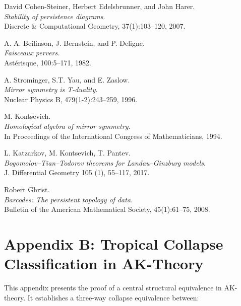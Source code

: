 \documentclass[11pt]{article}
\begin{document}
\begin{thebibliography}{9}

David Cohen-Steiner, Herbert Edelsbrunner, and John Harer.\\
\textit{Stability of persistence diagrams}.\\
Discrete \& Computational Geometry, 37(1):103--120, 2007.

A. A. Beilinson, J. Bernstein, and P. Deligne.\\
\textit{Faisceaux pervers}.\\
Ast\'erisque, 100:5–171, 1982.

A. Strominger, S.T. Yau, and E. Zaslow.\\
\textit{Mirror symmetry is T-duality}.\\
Nuclear Physics B, 479(1-2):243–259, 1996.

M. Kontsevich.\\
\textit{Homological algebra of mirror symmetry}.\\
In Proceedings of the International Congress of Mathematicians, 1994.

L. Katzarkov, M. Kontsevich, T. Pantev.\\
\textit{Bogomolov–Tian–Todorov theorems for Landau–Ginzburg models}.\\
J. Differential Geometry 105 (1), 55–117, 2017.

Robert Ghrist.\\
\textit{Barcodes: The persistent topology of data}.\\
Bulletin of the American Mathematical Society, 45(1):61--75, 2008.

\end{thebibliography}


\section*{Appendix B: Tropical Collapse Classification in AK-Theory}

This appendix presents the proof of a central structural equivalence in AK-theory.  
It establishes a three-way collapse equivalence between:
\end{document}
